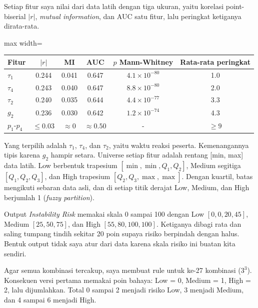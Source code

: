 Setiap fitur saya nilai dari data latih dengan tiga ukuran, yaitu korelasi point-biserial $|r|$, \emph{mutual information}, dan AUC satu fitur, lalu peringkat ketiganya dirata-rata.

\begin{adjustbox}{max width=\textwidth}\begin{tabular}{@{}lccccc@{}}
\toprule
\textbf{Fitur} & \textbf{$|r|$} & \textbf{MI} & \textbf{AUC} & \textbf{$p$ Mann-Whitney} & \textbf{Rata-rata peringkat} \\
\midrule
$\tau_1$ & 0.244 & 0.041 & 0.647 & $4.1\times10^{-80}$ & 1.0 \\
$\tau_4$ & 0.243 & 0.040 & 0.647 & $8.8\times10^{-80}$ & 2.0 \\
$\tau_2$ & 0.240 & 0.035 & 0.644 & $4.4\times10^{-77}$ & 3.3 \\
$g_2$ & 0.236 & 0.030 & 0.642 & $1.2\times10^{-74}$ & 4.3 \\
$p_1$-$p_4$ & $\leq 0.03$ & $\approx 0$ & $\approx 0.50$ & - & $\geq 9$ \\
\bottomrule
\end{tabular}\end{adjustbox}

Yang terpilih adalah $\tau_1$, $\tau_4$, dan $\tau_2$, yaitu waktu reaksi peserta. Kemenangannya tipis karena $g_2$ hampir setara. Universe setiap fitur adalah rentang [min, max] data latih. Low berbentuk trapesium $[\min, \min, Q_1, Q_2]$, Medium segitiga $[Q_1, Q_2, Q_3]$, dan High trapesium $[Q_2, Q_3, \max, \max]$. Dengan kuartil, batas mengikuti sebaran data asli, dan di setiap titik derajat Low, Medium, dan High berjumlah 1 (\emph{fuzzy partition}).

Output \emph{Instability Risk} memakai skala 0 sampai 100 dengan Low $[0,0,20,45]$, Medium $[25,50,75]$, dan High $[55,80,100,100]$. Ketiganya dibagi rata dan saling tumpang tindih sekitar 20 poin supaya risiko berpindah dengan halus. Bentuk output tidak saya atur dari data karena skala risiko ini buatan kita sendiri.


Agar semua kombinasi tercakup, saya membuat rule untuk ke-27 kombinasi ($3^3$). Konsekuen versi pertama memakai poin bahaya: Low = 0, Medium = 1, High = 2, lalu dijumlahkan. Total 0 sampai 2 menjadi risiko Low, 3 menjadi Medium, dan 4 sampai 6 menjadi High.

